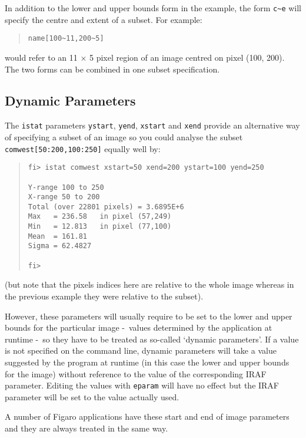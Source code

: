 \documentclass[twoside,11pt]{article}
\newcommand{\htmlref}[2]{#1}
\newcommand{\xlabel}[1]{}
\newcommand{\dash}{--}
\renewcommand{\dash}{-}
\begin{document}
In addition to the lower and upper bounds form in the example, the form
\verb!c~e! will specify the centre and extent of a subset. For example:
\begin{quote} \begin{verbatim}
name[100~11,200~5]
\end{verbatim} \end{quote}
would refer to an 11 $\times$ 5 pixel region of an image centred on pixel
(100, 200).
The two forms can be combined in one subset specification.

\subsection{\xlabel{dynamic_parameters}Dynamic Parameters}
The \texttt{istat} parameters \texttt{ystart}, \texttt{yend}, \texttt{xstart}
and \texttt{xend} provide an alternative way of specifying a subset of an image
so you could analyse the subset \texttt{comwest[50:200,100:250]} equally well
by:
\begin{quote} \begin{verbatim}
fi> istat comwest xstart=50 xend=200 ystart=100 yend=250

Y-range 100 to 250
X-range 50 to 200
Total (over 22801 pixels) = 3.6895E+6
Max   = 236.58   in pixel (57,249)
Min   = 12.813   in pixel (77,100)
Mean  = 161.81
Sigma = 62.4827

fi>
\end{verbatim} \end{quote}
(but note that the pixels indices here are relative to the whole image whereas
in the previous example they were relative to the subset).

However, these parameters will usually require to be set to the lower and
upper bounds for the particular image \dash\ values determined by the application
at runtime \dash\ so they have to be treated as so-called
\htmlref{`dynamic parameters'}{more_on_dynamic_parameters}.
If a value is not specified on the command line, dynamic parameters
will take a value suggested by the program at runtime (in this
case the lower and upper bounds for the image) without reference to the value
of the corresponding IRAF parameter. Editing the values with \texttt{eparam}
will have no effect but the IRAF parameter will be set to the value actually
used.

A number of Figaro applications have these start and end of image parameters
and they are always treated in the same way.
\end{document}
